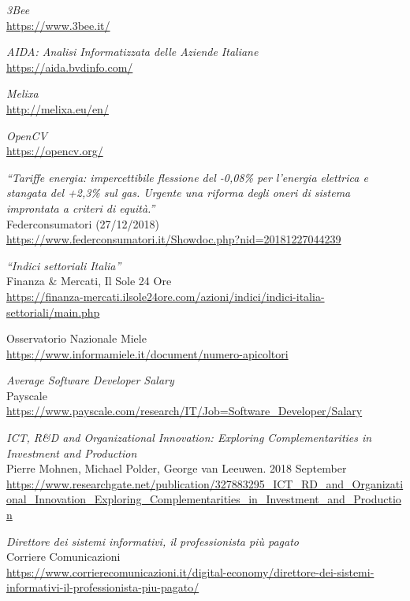 \newpage
\begin{thebibliography}{99}


\emph{3Bee} \\
\url{https://www.3bee.it/
}

\emph{AIDA: Analisi Informatizzata delle Aziende Italiane} \\
\url{https://aida.bvdinfo.com/}

\emph{Melixa} \\
\url{http://melixa.eu/en/}

\emph{OpenCV} \\
\url{https://opencv.org/}

\emph{``Tariffe energia: impercettibile flessione del -0,08\% per l’energia
elettrica e stangata del +2,3\% sul gas. Urgente una riforma degli oneri di
sistema improntata a criteri di equità.''} \\
Federconsumatori (27/12/2018) \\
\url{https://www.federconsumatori.it/Showdoc.php?nid=20181227044239}

\emph{``Indici settoriali Italia''} \\
Finanza \& Mercati, Il Sole 24 Ore \\
\url{https://finanza-mercati.ilsole24ore.com/azioni/indici/indici-italia-settoriali/main.php}

Osservatorio Nazionale Miele \\
\url{https://www.informamiele.it/document/numero-apicoltori}

\emph{Average Software Developer Salary} \\
Payscale \\
\url{https://www.payscale.com/research/IT/Job=Software_Developer/Salary}

\emph{ICT, R\&D and Organizational Innovation: Exploring Complementarities in
Investment and Production} \\
Pierre Mohnen, Michael Polder, George van Leeuwen. 2018 September\\
\url{https://www.researchgate.net/publication/327883295_ICT_RD_and_Organizational_Innovation_Exploring_Complementarities_in_Investment_and_Production}

\emph{Direttore dei sistemi informativi, il professionista più pagato} \\
Corriere Comunicazioni \\
\url{https://www.corrierecomunicazioni.it/digital-economy/direttore-dei-sistemi-informativi-il-professionista-piu-pagato/}


\end{thebibliography}
